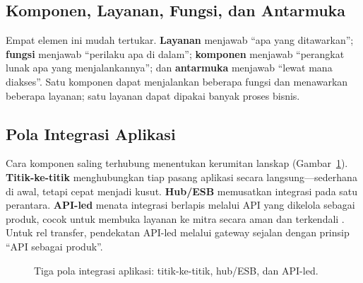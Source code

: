 \subsection{Komponen, Layanan, Fungsi, dan Antarmuka}

Empat elemen ini mudah tertukar. \textbf{Layanan} menjawab ``apa yang
ditawarkan''; \textbf{fungsi} menjawab ``perilaku apa di dalam''; \textbf{komponen}
menjawab ``perangkat lunak apa yang menjalankannya''; dan \textbf{antarmuka}
menjawab ``lewat mana diakses''. Satu komponen dapat menjalankan beberapa fungsi
dan menawarkan beberapa layanan; satu layanan dapat dipakai banyak proses bisnis.

\subsection{Pola Integrasi Aplikasi}

Cara komponen saling terhubung menentukan kerumitan lanskap
(Gambar~\ref{fig:integration-patterns}). \textbf{Titik-ke-titik} menghubungkan
tiap pasang aplikasi secara langsung---sederhana di awal, tetapi cepat menjadi
kusut. \textbf{Hub/ESB} memusatkan integrasi pada satu perantara. \textbf{API-led}
menata integrasi berlapis melalui API yang dikelola sebagai produk, cocok untuk
membuka layanan ke mitra secara aman dan terkendali \cite{medjaoui2018continuous}.
Untuk rel transfer, pendekatan API-led melalui gateway sejalan dengan prinsip
``API sebagai produk''.

\begin{figure}[htbp]
\centering
{}
\caption{Tiga pola integrasi aplikasi: titik-ke-titik, hub/ESB, dan API-led.}
\label{fig:integration-patterns}
\end{figure}

